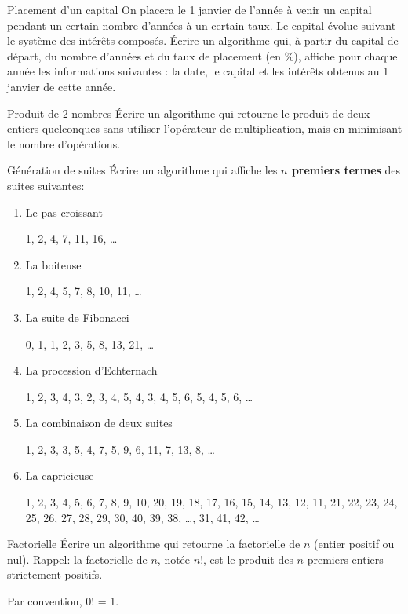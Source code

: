 \begin{Exercice}{Placement d'un capital}
	On placera le 1 janvier de l’année à venir un
	capital pendant un certain nombre d’années à un certain taux. Le
	capital évolue suivant le système des intérêts composés. Écrire un
	algorithme qui, à partir du capital de départ, du nombre d’années et du
	taux de placement (en \%), affiche pour chaque année les informations
	suivantes : la date, le capital et les intérêts obtenus au
	1 janvier de cette année.
\end{Exercice}

\bigskip
\begin{Exercice}{Produit de 2 nombres}
	Écrire un algorithme qui retourne le produit de deux entiers quelconques
	sans utiliser l’opérateur de multiplication, mais en minimisant le
	nombre d’opérations.
\end{Exercice}

\begin{Exercice}{Génération de suites}
	Écrire un algorithme qui affiche les \textbf{$n$ premiers termes} des
	suites suivantes:

	\begin{enumerate}[label=\alph*)]
	\item {Le pas croissant 
	
	1, 2, 4, 7, 11, 16, \dots}
	\item {La boiteuse
	
	1, 2, 4, 5, 7, 8, 10, 11, \dots}
	\item {La suite de Fibonacci
	
	0, 1, 1, 2, 3, 5, 8, 13, 21, \dots }
	\item {La procession d'Echternach
	
	1, 2, 3, 4, 3, 2, 3, 4, 5, 4, 3, 4, 5, 6, 5, 4, 5, 6, \dots}
	\item {La combinaison de deux suites
	
	1, 2, 3, 3, 5, 4, 7, 5, 9, 6, 11, 7, 13, 8, \dots }
	\item {La capricieuse
	
	1, 2, 3, 4, 5, 6, 7, 8, 9, 10, 20, 19, 18, 17, 16, 15, 14, 13, 12, 11,
	21, 22, 23, 24, 25, 26, 27, 28, 29, 30, 40, 39, 38, \dots, 31, 41, 42, \dots}
	\end{enumerate}
\end{Exercice}

\begin{Exercice}{Factorielle}
	Écrire un algorithme qui retourne la factorielle de $n$ (entier positif ou
	nul). Rappel: la factorielle de $n$, notée $n$!, est le produit des $n$
	premiers entiers strictement positifs. 
	
	Par convention, 0! = 1.
\end{Exercice}

